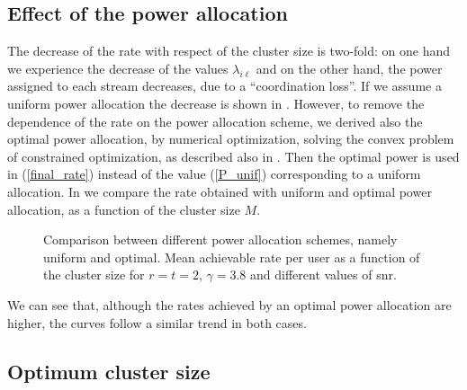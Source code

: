 \subsection{Effect of the power allocation}

The decrease of the rate with respect of the cluster size is two-fold: on one hand we experience the decrease of the %
 values $\lambda_{i\ell}$ and on the other hand, the power assigned to each stream decreases, due to a ``coordination loss''. If we assume a uniform power allocation the decrease is shown in . However, to remove the dependence of the rate on the power allocation scheme, we derived also the optimal power allocation, by numerical optimization, solving the convex problem of constrained optimization, as described also in \cite{armada11b}.%
Then the optimal power is used in (\ref{final_rate}) instead of the value (\ref{P_unif}) corresponding to a uniform allocation.
In  we compare the rate obtained with uniform and optimal power allocation, as a function of the cluster size $M$.
\begin{figure}[h]
\begin{center}
\begin{small}
\end{small}
\end{center}
\vspace*{-2.7mm}\caption{Comparison between different power allocation schemes, namely uniform and optimal. 
Mean achievable rate per user as a function of the cluster size for $r=t=2$, $\gamma=3.8$ and different values of \gls{snr}.}\label{rate2x2_unif_CVX}
\end{figure}
We can see that, although the rates achieved by an optimal power allocation are higher, the curves follow a similar trend in both cases.

\subsection{Optimum cluster size}

